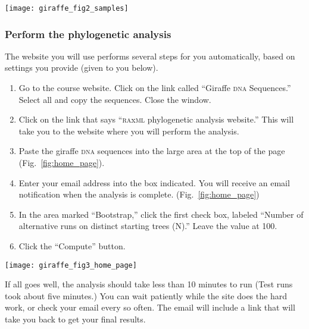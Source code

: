 \documentclass[11pt, addpoints]{exam}
\begin{document}
\begin{center}
	\texttt{[image: giraffe\_fig2\_samples]}
\end{center}

\subsubsection*{Perform the phylogenetic analysis}

The website you will use performs several steps for you automatically,
based on settings you provide (given to you below).

\begin{enumerate}
\item
  Go to the course website. Click on the link called ``Giraffe \textsc{dna}
  Sequences.'' Select all and copy the sequences. Close the window.
\item
  Click on the link that says ``\textsc{ra}x\textsc{ml} phylogenetic analysis website.'' This
  will take you to the website where you will perform the analysis. 
\item
  Paste the giraffe \textsc{dna} sequences into the large area
  at the top of the page (Fig.~\ref{fig:home_page}).
\item   
  Enter your email address into the box indicated. You will receive an email
  notification when the analysis is complete. (Fig.~\ref{fig:home_page})%
\item
	In the area marked ``Bootstrap,'' click the first check box, labeled ``Number of alternative
	runs on distinct starting trees (N).'' Leave the value at 100.
\item
	Click the “Compute” button.
\end{enumerate}

\newpage

\begin{center}
	\texttt{[image: giraffe\_fig3\_home\_page]}
\end{center}

\newpage

If all goes well, the analysis should take less than 10 minutes to run (Test runs took about five minutes.) 
You can wait patiently while the site does the hard work, or check your email every so often. 
The email will include a link that will take you back to get your final results.
\end{document}

